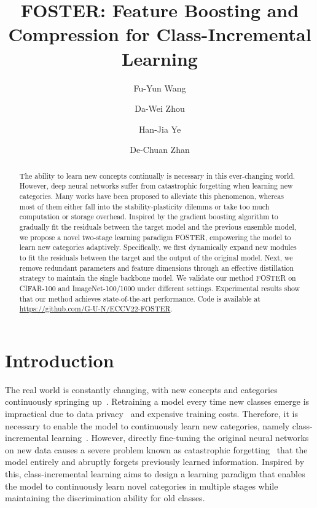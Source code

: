 \documentclass[runningheads]{llncs}
\begin{document}
\pagestyle{headings}
\mainmatter
\def\ECCVSubNumber{6471} 

\title{FOSTER: Feature Boosting and  Compression for Class-Incremental Learning}




\author{Fu-Yun Wang\and
Da-Wei Zhou\and
Han-Jia Ye\textsuperscript{\Letter} \and
De-Chuan Zhan}



\maketitle
\begin{abstract}
The ability to learn new concepts continually is necessary in this ever-changing world. However, deep neural networks suffer from catastrophic forgetting when learning new categories. Many works have been proposed to alleviate this phenomenon, whereas most of them either fall into the stability-plasticity dilemma or take too much computation or storage overhead.  Inspired by the gradient boosting algorithm to gradually fit the residuals between the target model and the previous ensemble model, we propose a novel two-stage learning paradigm FOSTER, empowering the model to learn new categories adaptively. Specifically, we first dynamically expand new modules to fit the residuals between the target and the output of the original model. Next, we remove redundant parameters and feature dimensions through an effective distillation strategy to maintain the single backbone model. We validate our method FOSTER on CIFAR-100 and ImageNet-100/1000 under different settings. Experimental results show that our method achieves state-of-the-art performance. Code is available at \url{https://github.com/G-U-N/ECCV22-FOSTER}.
\end{abstract}


\section{Introduction}\label{sec:intro}

The real world is constantly changing, with new concepts and categories continuously springing up~\cite{golab2003issues,zhou2021learning,wang2021afec,zhou2021learning2}. Retraining a model every time new classes emerge is impractical due to data privacy~\cite{delange2021continual} and expensive training costs. Therefore, it is necessary to enable the model to continuously learn new categories, namely class-incremental learning~\cite{zhou2022forward,zhou2022few,wang2021ordisco}. However, directly fine-tuning the original neural networks on new data causes a severe problem known as catastrophic forgetting~\cite{catastrophicforgetting} that the model entirely and abruptly forgets previously learned information. Inspired by this, class-incremental learning aims to design a learning paradigm that enables the model to continuously learn novel categories in multiple stages while maintaining the discrimination ability for old classes. 
\end{document}
